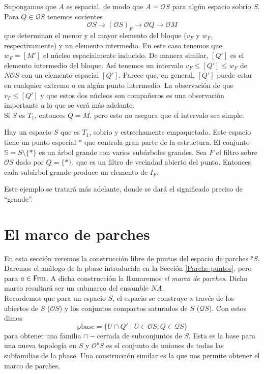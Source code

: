 Supongamos que $A$ es espacial, de modo que $A=\mathcal{O}S$ para algún espacio sobrio $S$. Para $Q\in \mathcal{Q}S$ tenemos cocientes 
\[
\mathcal{O}S\to (\mathcal{O}S)_F\to \mathcal{O}Q\to \mathcal{O}M
\]
que determinan el menor y el mayor elemento del bloque ($v_F$ y $w_F$, respectivamente) y un elemento intermedio. En este caso tenemos que $w_F=[M']$ el núcleo espacialmente inducido. De manera similar, $[Q']$ es el elemento intermedio del bloque. Así tenemos un intervalo $v_F\leq [Q']\leq w_F$ de $N\mathcal{O}S$ con un elemento espacial $[Q']$. Parece que, en general, $[Q']$ puede estar en cualquier extremo o en algún punto intermedio. La observación de que $v_F\leq [Q']$ y que estos dos núcleos son compañeros es una observación importante a lo que se verá más adelante.\\

Si $S$ es $T_1$, entonces $Q=M$, pero esto no asegura que el intervalo sea simple.\\

\begin{ej}
    Hay un espacio $S$ que es $T_1$, sobrio y estrechamente empaquetado. Este espacio tiene un punto especial $*$ que controla gran parte de la estructura. El conjunto $\mathbb{S}=S\setminus \{*\}$ es un árbol grande con varios subárboles grandes. Sea $F$ el filtro sobre $\mathcal{O}S$ dado por $Q=\{*\}$, que es un filtro de vecindad abierto del punto. Entonces cada subárbol grande produce un elemento de $I_F$.
\end{ej}

Este ejemplo se tratará más adelante, donde se dará el significado preciso de ``grande''.

\section{El marco de parches}\label{Marco de parche}

En esta sección veremos la construcción libre de puntos del espacio de parches $^pS$. Daremos el análogo de la pbase introducida en la Sección \ref{Parche puntos}, pero para $a\in \mathrm{Frm}$. A dicha construcción la llamaremos \emph{el marco de parches}. Dicho marco resultará ser un submarco del ensamble $NA$.\\

Recordemos que para un espacio $S$, el espacio se construye a través de los abiertos de $S$ ($\mathcal{O}S$) y los conjuntos compactos saturados de $S$ ($\mathcal{Q}S$). Con estos dimos 
\[
\mbox{pbase}=\{U\cap Q'\mid U\in \mathcal{O}S, Q\in \mathcal{Q}S\}
\]
para obtener una familia $\cap-$cerrada de subconjuntos de $S$. Esta es la base para una nueva topología en $S$ y $\mathcal{O}^pS$ es el conjunto de uniones de todas las subfamilias de la pbase. Una construcción similar es la que nos permite obtener el marco de parches. \\

